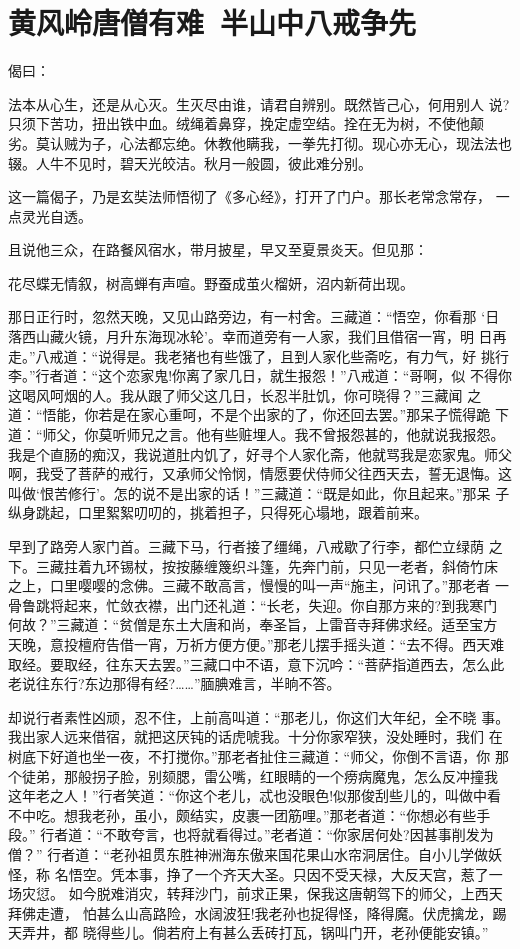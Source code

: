 \chapter{黄风岭唐僧有难~半山中八戒争先}

偈曰：

法本从心生，还是从心灭。生灭尽由谁，请君自辨别。既然皆己心，何用别人
说?只须下苦功，扭出铁中血。绒绳着鼻穿，挽定虚空结。拴在无为树，不使他颠
劣。莫认贼为子，心法都忘绝。休教他瞒我，一拳先打彻。现心亦无心，现法法也
辍。人牛不见时，碧天光皎洁。秋月一般圆，彼此难分别。

这一篇偈子，乃是玄奘法师悟彻了《多心经》，打开了门户。那长老常念常存，
一点灵光自透。

且说他三众，在路餐风宿水，带月披星，早又至夏景炎天。但见那：

花尽蝶无情叙，树高蝉有声喧。野蚕成茧火榴妍，沼内新荷出现。

那日正行时，忽然天晚，又见山路旁边，有一村舍。三藏道：“悟空，你看那
‘日落西山藏火镜，月升东海现冰轮’。幸而道旁有一人家，我们且借宿一宵，明
日再走。”八戒道：“说得是。我老猪也有些饿了，且到人家化些斋吃，有力气，好
挑行李。”行者道：“这个恋家鬼!你离了家几日，就生报怨！”八戒道：“哥啊，似
不得你这喝风呵烟的人。我从跟了师父这几日，长忍半肚饥，你可晓得？”三藏闻
之道：“悟能，你若是在家心重呵，不是个出家的了，你还回去罢。”那呆子慌得跪
下道：“师父，你莫听师兄之言。他有些赃埋人。我不曾报怨甚的，他就说我报怨。
我是个直肠的痴汉，我说道肚内饥了，好寻个人家化斋，他就骂我是恋家鬼。师父
啊，我受了菩萨的戒行，又承师父怜悯，情愿要伏侍师父往西天去，誓无退悔。这
叫做‘恨苦修行’。怎的说不是出家的话！”三藏道：“既是如此，你且起来。”那呆
子纵身跳起，口里絮絮叨叨的，挑着担子，只得死心塌地，跟着前来。

早到了路旁人家门首。三藏下马，行者接了缰绳，八戒歇了行李，都伫立绿荫
之下。三藏拄着九环锡杖，按按藤缠篾织斗篷，先奔门前，只见一老者，斜倚竹床
之上，口里嘤嘤的念佛。三藏不敢高言，慢慢的叫一声“施主，问讯了。”那老者
一骨鲁跳将起来，忙敛衣襟，出门还礼道：“长老，失迎。你自那方来的?到我寒门
何故？”三藏道：“贫僧是东土大唐和尚，奉圣旨，上雷音寺拜佛求经。适至宝方
天晚，意投檀府告借一宵，万祈方便方便。”那老儿摆手摇头道：“去不得。西天难
取经。要取经，往东天去罢。”三藏口中不语，意下沉吟：“菩萨指道西去，怎么此
老说往东行?东边那得有经?……”腼腆难言，半晌不答。

却说行者素性凶顽，忍不住，上前高叫道：“那老儿，你这们大年纪，全不晓
事。我出家人远来借宿，就把这厌钝的话虎唬我。十分你家窄狭，没处睡时，我们
在树底下好道也坐一夜，不打搅你。”那老者扯住三藏道：“师父，你倒不言语，你
那个徒弟，那般拐子脸，别颏腮，雷公嘴，红眼睛的一个痨病魔鬼，怎么反冲撞我
这年老之人！”行者笑道：“你这个老儿，忒也没眼色!似那俊刮些儿的，叫做中看
不中吃。想我老孙，虽小，颇结实，皮裹一团筋哩。”那老者道：“你想必有些手段。”
行者道：“不敢夸言，也将就看得过。”老者道：“你家居何处?因甚事削发为僧？”
行者道：“老孙祖贯东胜神洲海东傲来国花果山水帘洞居住。自小儿学做妖怪，称
名悟空。凭本事，挣了一个齐天大圣。只因不受天禄，大反天宫，惹了一场灾愆。
如今脱难消灾，转拜沙门，前求正果，保我这唐朝驾下的师父，上西天拜佛走遭，
怕甚么山高路险，水阔波狂!我老孙也捉得怪，降得魔。伏虎擒龙，踢天弄井，都
晓得些儿。倘若府上有甚么丢砖打瓦，锅叫门开，老孙便能安镇。”

